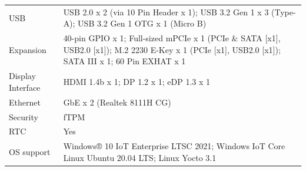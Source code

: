 \begin{longtable}[]{@{}ll@{}}
\begin{minipage}[t]{0.29\columnwidth}
USB\strut
\end{minipage} & \begin{minipage}[t]{0.65\columnwidth}\raggedright
USB 2.0 x 2 (via 10 Pin Header x 1); USB 3.2 Gen 1 x 3 (Type-A); USB 3.2
Gen 1 OTG x 1 (Micro B)\strut
\end{minipage}\tabularnewline
\begin{minipage}[t]{0.29\columnwidth}\raggedright
Expansion\strut
\end{minipage} & \begin{minipage}[t]{0.65\columnwidth}\raggedright
40-pin GPIO x 1; Full-sized mPCIe x 1 (PCIe \& SATA {[}x1{]}, USB2.0
{[}x1{]}); M.2 2230 E-Key x 1 (PCIe {[}x1{]}, USB2.0 {[}x1{]}); SATA III
x 1; 60 Pin EXHAT x 1\strut
\end{minipage}\tabularnewline
\begin{minipage}[t]{0.29\columnwidth}\raggedright
Display Interface\strut
\end{minipage} & \begin{minipage}[t]{0.65\columnwidth}\raggedright
HDMI 1.4b x 1; DP 1.2 x 1; eDP 1.3 x 1\strut
\end{minipage}\tabularnewline
\begin{minipage}[t]{0.29\columnwidth}\raggedright
Ethernet\strut
\end{minipage} & \begin{minipage}[t]{0.65\columnwidth}\raggedright
GbE x 2 (Realtek 8111H CG)\strut
\end{minipage}\tabularnewline
\begin{minipage}[t]{0.29\columnwidth}\raggedright
Security\strut
\end{minipage} & \begin{minipage}[t]{0.65\columnwidth}\raggedright
fTPM\strut
\end{minipage}\tabularnewline
\begin{minipage}[t]{0.29\columnwidth}\raggedright
RTC\strut
\end{minipage} & \begin{minipage}[t]{0.65\columnwidth}\raggedright
Yes\strut
\end{minipage}\tabularnewline
\begin{minipage}[t]{0.29\columnwidth}\raggedright
OS support\strut
\end{minipage} & \begin{minipage}[t]{0.65\columnwidth}\raggedright
Windows® 10 IoT Enterprise LTSC 2021; Windows IoT Core Linux Ubuntu
20.04 LTS; Linux Yocto 3.1\strut
\end{minipage}\tabularnewline

\end{longtable}
